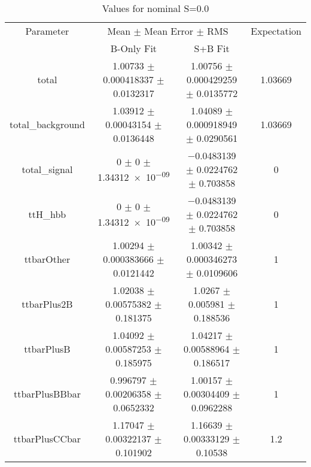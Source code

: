 \begin{table}
\centering
\caption{Values for nominal S=0.0}
\begin{tabular}{cccc}
\toprule
Parameter & \multicolumn{2}{c}{Mean $\pm$ Mean Error $\pm$ RMS} & Expectation\\
 & B-Only Fit & S+B Fit & \\
\midrule
total & \num{1.00733} $\pm$ \num{0.000418337} $\pm$ \num{0.0132317} & \num{1.00756} $\pm$ \num{0.000429259} $\pm$ \num{0.0135772} & \num{1.03669}\\
total\_background & \num{1.03912} $\pm$ \num{0.00043154} $\pm$ \num{0.0136448} & \num{1.04089} $\pm$ \num{0.000918949} $\pm$ \num{0.0290561} & \num{1.03669}\\
total\_signal & \num{0} $\pm$ \num{0} $\pm$ \num{1.34312e-09} & \num{-0.0483139} $\pm$ \num{0.0224762} $\pm$ \num{0.703858} & \num{0}\\
ttH\_hbb & \num{0} $\pm$ \num{0} $\pm$ \num{1.34312e-09} & \num{-0.0483139} $\pm$ \num{0.0224762} $\pm$ \num{0.703858} & \num{0}\\
ttbarOther & \num{1.00294} $\pm$ \num{0.000383666} $\pm$ \num{0.0121442} & \num{1.00342} $\pm$ \num{0.000346273} $\pm$ \num{0.0109606} & \num{1}\\
ttbarPlus2B & \num{1.02038} $\pm$ \num{0.00575382} $\pm$ \num{0.181375} & \num{1.0267} $\pm$ \num{0.005981} $\pm$ \num{0.188536} & \num{1}\\
ttbarPlusB & \num{1.04092} $\pm$ \num{0.00587253} $\pm$ \num{0.185975} & \num{1.04217} $\pm$ \num{0.00588964} $\pm$ \num{0.186517} & \num{1}\\
ttbarPlusBBbar & \num{0.996797} $\pm$ \num{0.00206358} $\pm$ \num{0.0652332} & \num{1.00157} $\pm$ \num{0.00304409} $\pm$ \num{0.0962288} & \num{1}\\
ttbarPlusCCbar & \num{1.17047} $\pm$ \num{0.00322137} $\pm$ \num{0.101902} & \num{1.16639} $\pm$ \num{0.00333129} $\pm$ \num{0.10538} & \num{1.2}\\
\bottomrule
\end{tabular}
\end{table}